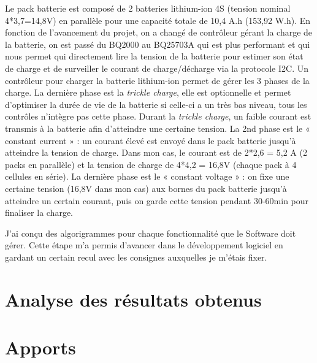 \documentclass[a4paper, 11pt]{report}
\begin{document}
Le pack batterie est composé de 2 batteries lithium-ion 4S (tension nominal 4*3,7=14,8V) en parallèle pour une capacité totale de 10,4 A.h (153,92 W.h). En fonction de l’avancement du projet, on a changé de contrôleur gérant la charge de la batterie, on est passé du BQ2000 au BQ25703A qui est plus performant et qui nous permet qui directement lire la tension de la batterie pour estimer son état de charge et de surveiller le courant de charge/décharge via la protocole I2C.
Un contrôleur pour charger la batterie lithium-ion permet de gérer les 3 phases de la charge. La dernière phase est la \emph{trickle charge}, elle est optionnelle et permet d’optimiser la durée de vie de la batterie si celle-ci a un très bas niveau, tous les contrôles n’intègre pas cette phase. Durant la \emph{trickle charge}, un faible courant est transmis à la batterie afin d’atteindre une certaine tension. La 2nd phase est le « constant current » : un courant élevé est envoyé dans le pack batterie jusqu’à atteindre la tension de charge. Dans mon cas, le courant est de 2*2,6 = 5,2 A (2 packs en parallèle) et la tension de charge de 4*4,2 = 16,8V (chaque pack à 4 cellules en série). La dernière phase est le « constant voltage » : on fixe une certaine tension (16,8V dans mon cas) aux bornes du pack batterie jusqu’à atteindre un certain courant, puis on garde cette tension pendant 30-60min pour finaliser la charge.

J'ai conçu des algorigrammes pour chaque fonctionnalité que le Software doit gérer. Cette étape m'a permis d'avancer dans le développement logiciel en gardant un certain recul avec les consignes auxquelles je m'étais fixer.

\chapter{Analyse des résultats obtenus}

\chapter{Apports }
\end{document}

